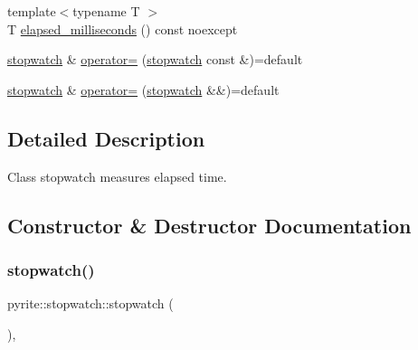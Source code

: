 \begin{DoxyCompactItemize}
\item 
{\footnotesize template$<$typename T $>$ }\\T \mbox{\hyperlink{classpyrite_1_1stopwatch_a4d5006e83d13f28295756506415aeb15}{elapsed\+\_\+milliseconds}} () const noexcept
\item 
\mbox{\hyperlink{classpyrite_1_1stopwatch}{stopwatch}} \& \mbox{\hyperlink{classpyrite_1_1stopwatch_a74042d6442db0cc278a76c6c548ed47b}{operator=}} (\mbox{\hyperlink{classpyrite_1_1stopwatch}{stopwatch}} const \&)=default
\item 
\mbox{\hyperlink{classpyrite_1_1stopwatch}{stopwatch}} \& \mbox{\hyperlink{classpyrite_1_1stopwatch_a54c39e020d176c0e79d9726d44d41be2}{operator=}} (\mbox{\hyperlink{classpyrite_1_1stopwatch}{stopwatch}} \&\&)=default
\end{DoxyCompactItemize}


\subsection{Detailed Description}
Class stopwatch measures elapsed time. 

\subsection{Constructor \& Destructor Documentation}
\mbox{\label{classpyrite_1_1stopwatch_a685312010147a137543d0a65220153e6}} 
\subsubsection{\texorpdfstring{stopwatch()}{stopwatch()}\hspace{0.1cm}{\footnotesize\ttfamily [1/3]}}
{\footnotesize\ttfamily pyrite\+::stopwatch\+::stopwatch (\begin{DoxyParamCaption}{ }\end{DoxyParamCaption})\hspace{0.3cm}{\ttfamily [inline]}, {\ttfamily [noexcept]}}


